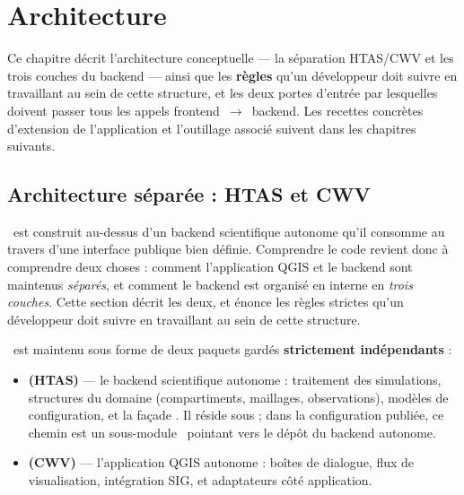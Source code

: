 \chapter{Architecture}
\label{chap-dev}
\label{chap-description-src}

\renewcommand{\headrulewidth}{0.3pt}
\fancyhead[LE]{\thepage} \fancyhead[RE]{\nouppercase{\textbf{\leftmark}}}
\fancyhead[RO]{\thepage} \fancyhead[LO]{\nouppercase{\textbf{\rightmark}}}
\fancyfoot[L,C,R]{}

\setlength{\parindent}{0.35cm}

\minitoc
\newpage

Ce chapitre décrit l'architecture conceptuelle --- la séparation HTAS/CWV et les trois couches du backend --- ainsi que les \textbf{règles} qu'un développeur doit suivre en travaillant au sein de cette structure, et les deux portes d'entrée par lesquelles doivent passer tous les appels frontend~$\rightarrow$~backend. Les recettes concrètes d'extension de l'application et l'outillage associé suivent dans les chapitres suivants.

\section{Architecture séparée : HTAS et CWV}
\label{sec-split}

\cwv~est construit au-dessus d'un backend scientifique autonome qu'il consomme au travers d'une interface publique bien définie. Comprendre le code revient donc à comprendre deux choses : comment l'application QGIS et le backend sont maintenus \emph{séparés}, et comment le backend est organisé en interne en \emph{trois couches}. Cette section décrit les deux, et énonce les règles strictes qu'un développeur doit suivre en travaillant au sein de cette structure.

\cwv~est maintenu sous forme de deux paquets gardés \textbf{strictement indépendants} :

\begin{itemize}
    \item \textbf{ (HTAS)} --- le backend scientifique autonome : traitement des simulations, structures du domaine (compartiments, maillages, observations), modèles de configuration, et la façade . Il réside sous  ; dans la configuration publiée, ce chemin est un sous-module \gitlab~pointant vers le dépôt du backend autonome.
    \item \textbf{ (CWV)} --- l'application QGIS autonome : boîtes de dialogue, flux de visualisation, intégration SIG, et adaptateurs côté application.
\end{itemize}

